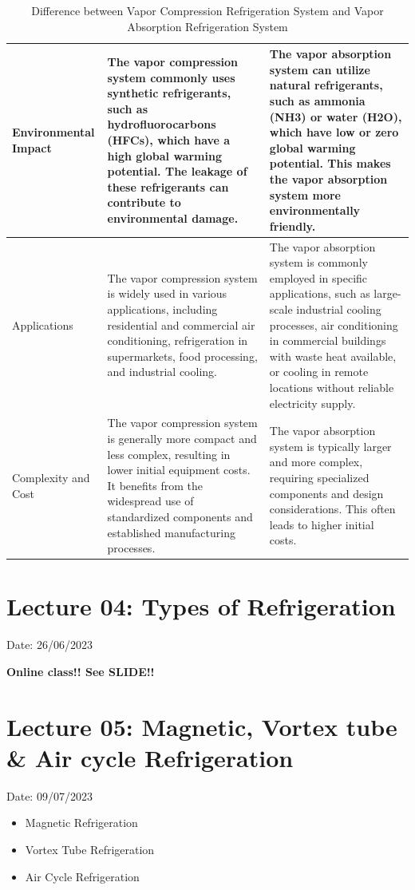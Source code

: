 \documentclass{article}
\begin{document}
\begin{table}[!htbp]
\begin{tabularx}{\linewidth}{@{}>{\hsize=0.6\hsize}X *{2}{>{\hsize=1.2\hsize}X}@{}}
    \hline 
    Environmental Impact & The vapor compression system commonly uses synthetic refrigerants, such as hydrofluorocarbons (HFCs), which have a high global warming potential. The leakage of these refrigerants can contribute to environmental damage. & The vapor absorption system can utilize natural refrigerants, such as ammonia (NH3) or water (H2O), which have low or zero global warming potential. This makes the vapor absorption system more environmentally friendly.\\
    \hline 
    Applications & The vapor compression system is widely used in various applications, including residential and commercial air conditioning, refrigeration in supermarkets, food processing, and industrial cooling. & The vapor absorption system is commonly employed in specific applications, such as large-scale industrial cooling processes, air conditioning in commercial buildings with waste heat available, or cooling in remote locations without reliable electricity supply. \\
    \hline 
    Complexity and Cost & The vapor compression system is generally more compact and less complex, resulting in lower initial equipment costs. It benefits from the widespread use of standardized components and established manufacturing processes. & The vapor absorption system is typically larger and more complex, requiring specialized components and design considerations. This often leads to higher initial costs. \\ 
    \hline
  \end{tabularx}
  \caption{Difference between Vapor Compression Refrigeration System and Vapor Absorption Refrigeration System }
  \label{tab:full-width-table}
\end{table}

\pagebreak
\section{Lecture 04: Types of Refrigeration} 
\hfill Date: 26/06/2023 

\textbf{Online class!! See SLIDE!!}
\vspace*{2cm}

\section{Lecture 05: Magnetic, Vortex tube \& Air cycle Refrigeration} 
\hfill Date: 09/07/2023 

\begin{itemize}
  \item Magnetic Refrigeration 
  \item Vortex Tube Refrigeration
  \item Air Cycle Refrigeration 
\end{itemize}
\end{document}
